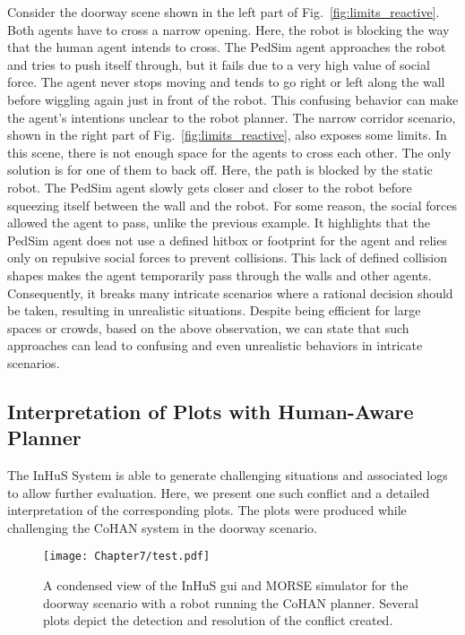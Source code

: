 Consider the doorway scene shown in the left part of Fig.~\ref{fig:limits_reactive}. Both agents have to cross a narrow opening. Here, the robot is blocking the way that the human agent intends to cross. The PedSim agent approaches the robot and tries to push itself through, but it fails due to a very high value of social force. The agent never stops moving and tends to go right or left along the wall before wiggling again just in front of the robot. 
This confusing behavior can make the agent's intentions unclear to the robot planner. 
The narrow corridor scenario, shown in the right part of Fig.~\ref{fig:limits_reactive}, also exposes some limits. In this scene, there is not enough space for the agents to cross each other. The only solution is for one of them to back off. Here, the path is blocked by the static robot. The PedSim agent slowly gets closer and closer to the robot before squeezing itself between the wall and the robot. For some reason, the social forces allowed the agent to pass, unlike the previous example. It highlights that the PedSim agent does not use a defined hitbox or footprint for the agent and relies only on repulsive social forces to prevent collisions. This lack of defined collision shapes makes the agent temporarily pass through the walls and other agents. Consequently, it breaks many intricate scenarios where a rational decision should be taken, resulting in unrealistic situations. Despite being efficient for large spaces or crowds, based on the above observation, we can state that such approaches can lead to confusing and even unrealistic behaviors in intricate scenarios.  

\subsection{Interpretation of Plots with Human-Aware Planner}

The InHuS System is able to generate challenging situations 
and associated logs to allow further evaluation.
Here, we present one such conflict and a detailed interpretation of the corresponding plots. The plots were produced while challenging the CoHAN system in the doorway scenario.

\begin{figure}[h]
    \centering
    \texttt{[image: Chapter7/test.pdf]}
    
    \caption{
    A condensed view of the InHuS \acrshort{gui} and MORSE simulator for the doorway scenario with a robot running the CoHAN planner. Several plots depict the detection and resolution of the conflict created. 
    }
    \label{fig:cohan_passage_block}
\end{figure}


